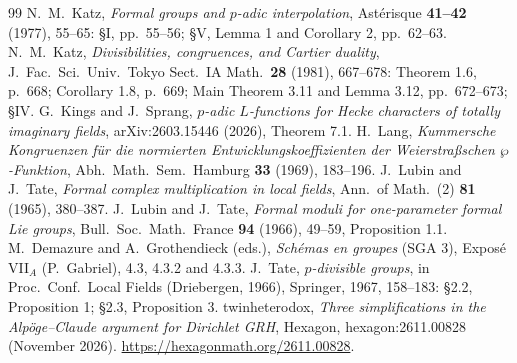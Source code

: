 \documentclass[11pt]{amsart}
\theoremstyle{definition}
\theoremstyle{remark}
\begin{document}
\begin{thebibliography}{99}
 N.~M.~Katz, \emph{Formal groups and $p$-adic interpolation}, Ast\'erisque \textbf{41--42} (1977), 55--65: \S I, pp.~55--56; \S V, Lemma 1 and Corollary 2, pp.~62--63.
 N.~M.~Katz, \emph{Divisibilities, congruences, and Cartier duality}, J.\ Fac.\ Sci.\ Univ.\ Tokyo Sect.\ IA Math.\ \textbf{28} (1981), 667--678: Theorem 1.6, p.~668; Corollary 1.8, p.~669; Main Theorem 3.11 and Lemma 3.12, pp.~672--673; \S IV.
 G.~Kings and J.~Sprang, \emph{$p$-adic $L$-functions for Hecke characters of totally imaginary fields}, arXiv:2603.15446 (2026), Theorem 7.1.
 H.~Lang, \emph{Kummersche Kongruenzen f\"ur die normierten Entwicklungskoeffizienten der Weierstra\ss schen $\wp$-Funktion}, Abh.\ Math.\ Sem.\ Hamburg \textbf{33} (1969), 183--196.
 J.~Lubin and J.~Tate, \emph{Formal complex multiplication in local fields}, Ann.\ of Math.\ (2) \textbf{81} (1965), 380--387.
 J.~Lubin and J.~Tate, \emph{Formal moduli for one-parameter formal Lie groups}, Bull.\ Soc.\ Math.\ France \textbf{94} (1966), 49--59, Proposition 1.1.
 M.~Demazure and A.~Grothendieck (eds.), \emph{Sch\'emas en groupes} (SGA 3), Expos\'e VII$_A$ (P.~Gabriel), 4.3, 4.3.2 and 4.3.3.
 J.~Tate, \emph{$p$-divisible groups}, in Proc.\ Conf.\ Local Fields (Driebergen, 1966), Springer, 1967, 158--183: \S2.2, Proposition 1; \S2.3, Proposition 3.
 twinheterodox, \emph{Three simplifications in the Alp\"oge--Claude argument for Dirichlet GRH}, Hexagon, hexagon:2611.00828 (November 2026). \url{https://hexagonmath.org/2611.00828}.
\end{thebibliography}
\end{document}
